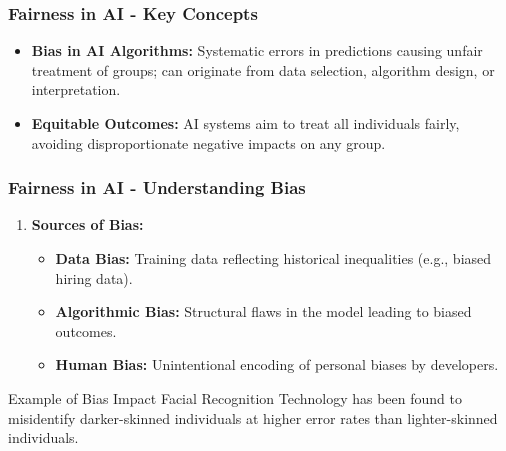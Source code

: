 \documentclass[aspectratio=169]{beamer}
\begin{document}
\begin{frame}[fragile]
    \frametitle{Fairness in AI - Key Concepts}
    \begin{itemize}
        \item \textbf{Bias in AI Algorithms:} Systematic errors in predictions causing unfair treatment of groups; can originate from data selection, algorithm design, or interpretation.
        \item \textbf{Equitable Outcomes:} AI systems aim to treat all individuals fairly, avoiding disproportionate negative impacts on any group.
    \end{itemize}
\end{frame}

\begin{frame}[fragile]
    \frametitle{Fairness in AI - Understanding Bias}
    \begin{enumerate}
        \item \textbf{Sources of Bias:}
        \begin{itemize}
            \item \textbf{Data Bias:} Training data reflecting historical inequalities (e.g., biased hiring data).
            \item \textbf{Algorithmic Bias:} Structural flaws in the model leading to biased outcomes.
            \item \textbf{Human Bias:} Unintentional encoding of personal biases by developers.
        \end{itemize}
    \end{enumerate}
    
    \begin{block}{Example of Bias Impact}
        Facial Recognition Technology has been found to misidentify darker-skinned individuals at higher error rates than lighter-skinned individuals.
    \end{block}
\end{frame}
\end{document}
